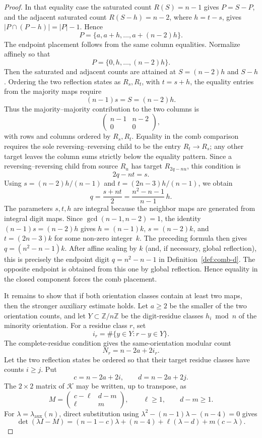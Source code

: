 \documentclass{amsart}
\theoremstyle{definition}
\theoremstyle{remark}
\newcommand{\Z}{\mathbb{Z}}
\begin{document}
\begin{proof}
In that equality case the saturated count \(R(S)=n-1\) gives
\(P=S-P\), and the adjacent saturated count \(R(S-h)=n-2\), where
\(h=t-s\), gives \(|P\cap(P-h)|=|P|-1\).  Hence
\[
  P=\{a,a+h,\ldots,a+(n-2)h\}.
\]
The endpoint placement follows from the same column equalities.  Normalize
affinely so that
\[
  P=\{0,h,\ldots,(n-2)h\}.
\]
Then the saturated and adjacent counts are attained at
\(S=(n-2)h\) and \(S-h\).  Ordering the two reflection states as
\(R_s,R_t\), with \(t=s+h\), the equality entries from the majority
maps require
\[
  (n-1)s=S=(n-2)h.
\]
Thus the majority--majority contribution to the two columns is
\[
  \begin{pmatrix}n-1&n-2\\ 0&0\end{pmatrix},
\]
with rows and columns ordered by \(R_s,R_t\).  Equality in the comb
comparison requires the sole reversing--reversing child to be the entry
\(R_t\to R_s\); any other target leaves the column sums strictly below
the equality pattern.  Since a reversing--reversing child from source
\(R_u\) has target \(R_{2q-nu}\), this condition is
\[
  2q-nt=s.
\]
Using \(s=(n-2)h/(n-1)\) and \(t=(2n-3)h/(n-1)\), we obtain
\[
  q=\frac{s+nt}{2}=\frac{n^2-n-1}{n-1}\,h.
\]
The parameters \(s,t,h\) are integral because the neighbor maps are
generated from integral digit maps.  Since \(\gcd(n-1,n-2)=1\), the
identity \((n-1)s=(n-2)h\) gives \(h=(n-1)k\),
\(s=(n-2)k\), and \(t=(2n-3)k\) for some non-zero integer~\(k\).
The preceding formula then gives \(q=(n^2-n-1)k\).  After affine scaling
by \(k\) (and, if necessary, global reflection), this is precisely the
endpoint digit \(q=n^2-n-1\) in Definition~\ref{def:comb-d}.  The
opposite endpoint is obtained from this one by global reflection.  Hence
equality in the closed component forces the comb placement.

It remains to show that if both orientation classes contain at least two
maps, then the stronger auxiliary estimate holds.  Let \(a\ge2\) be the
smaller of the two orientation counts, and let \(Y\subset\Z/n\Z\) be the
digit-residue classes \(h_i\bmod n\) of the minority orientation.  For a
residue class \(r\), set
\[
  i_r=\#\{y\in Y:r-y\in Y\}.
\]
The complete-residue condition gives the same-orientation modular count
\[
  N_r=n-2a+2i_r.
\]
Let the two reflection states be ordered so that their target residue
classes have counts \(i\ge j\).  Put
\[
  c=n-2a+2i,
  \qquad
  d=n-2a+2j.
\]
The \(2\times2\) matrix of \(\mathcal K\) may be written, up to
transpose, as
\begin{equation}\label{eq:d1-general-two-state-matrix}
  M=\begin{pmatrix}c-\ell&d-m\\ \ell&m\end{pmatrix},
  \qquad \ell\ge1,
  \qquad d-m\ge1.
\end{equation}
For \(\lambda=\lambda_{\mathrm{aux}}(n)\), direct substitution using
\(\lambda^2-(n-1)\lambda-(n-4)=0\) gives
\begin{equation}\label{eq:lambda-aux-characteristic-test}
  \det(\lambda I-M)
  =(n-1-c)\lambda+(n-4)+\ell(\lambda-d)+m(c-\lambda).
\end{equation}


\end{proof}
\end{document}
